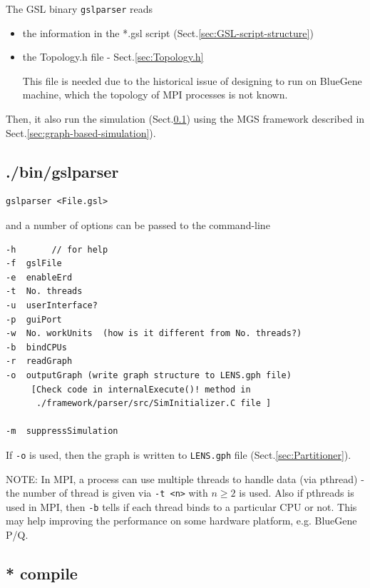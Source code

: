 The GSL binary \verb!gslparser! reads
\begin{itemize}
  \item the information in the *.gsl script
  (Sect.\ref{sec:GSL-script-structure})

   \item the Topology.h file  - Sect.\ref{sec:Topology.h}
   
This file is needed due to the historical issue of designing to run on BlueGene
machine, which the topology of MPI processes is not known.
\end{itemize}

Then, it also run the simulation (Sect.\ref{sec:gslparser}) using the MGS
framework described in Sect.\ref{sec:graph-based-simulation}).


\subsection{./bin/gslparser}
\label{sec:gslparser}

\begin{verbatim}
gslparser <File.gsl>
\end{verbatim}
and a number of options can be passed to the command-line
\begin{verbatim}
-h       // for help
-f  gslFile
-e  enableErd
-t  No. threads
-u  userInterface?
-p  guiPort
-w  No. workUnits  (how is it different from No. threads?)
-b  bindCPUs
-r  readGraph
-o  outputGraph (write graph structure to LENS.gph file)
     [Check code in internalExecute()! method in
      ./framework/parser/src/SimInitializer.C file ]
     
-m  suppressSimulation
\end{verbatim}
If \verb!-o! is used, then the graph is written to \verb!LENS.gph! file
(Sect.\ref{sec:Partitioner}).

NOTE: In MPI, a process can use multiple threads to handle data (via pthread) -
the number of thread is given via \verb!-t <n>! with $n\ge 2$ is used. Also if
pthreads is used in MPI, then \verb!-b! tells if each thread binds to a
particular CPU or not. This may help improving the performance on some hardware
platform, e.g. BlueGene P/Q.


\subsection{* compile}
\label{sec:compile-gslparser}
\label{sec:gslparser-how-it-is-compiled}

